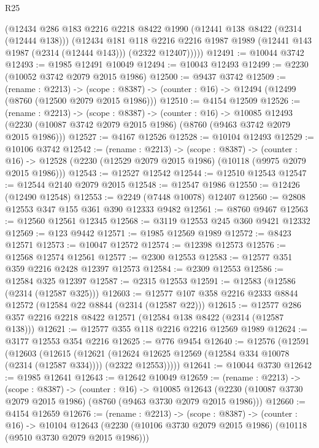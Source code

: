 \begin{lexlean}{R25}
\begin{coremodule}
        (@12434
          @286
          @183
          @2216
          @2218
          @8422
          @1990
          (@12441 @138 @8422 (@2314 (@12444 @138)))
          (@12434
            @181
            @118
            @2216
            @2216
            @1987
            @1989
            (@12441 @143 @1987 (@2314 (@12444 @143)))
            (@2322 @12407)))))
@12491 := @10044 @3742
@12493 := @1985 @12491 @10049
@12494 := @10043 @12493
@12499 := @2230 (@10052 @3742 @2079 @2015 @1986)
@12500 := @9437 @3742
@12509 := (rename : @2213) ->
  (scope : @8387) -> (counter : @16) -> @12494 (@12499 (@8760 (@12500 @2079 @2015 @1986)))
@12510 := @4154 @12509
@12526 := (rename : @2213) ->
  (scope : @8387) ->
  (counter : @16) ->
  @10085 @12493 (@2230 (@10087 @3742 @2079 @2015 @1986) (@8760 (@9463 @3742 @2079 @2015 @1986)))
@12527 := @4167 @12526
@12528 := @10104 @12493
@12529 := @10106 @3742
@12542 := (rename : @2213) ->
  (scope : @8387) ->
  (counter : @16) -> @12528 (@2230 (@12529 @2079 @2015 @1986) (@10118 (@9975 @2079 @2015 @1986)))
@12543 := @12527 @12542
@12544 := @12510 @12543
@12547 := @12544 @2140 @2079 @2015
@12548 := @12547 @1986
@12550 := @12426 (@12490 @12548)
@12553 := @2249 (@7448 @10078) @12407
@12560 := @2808 @12553 @347 @155 @361 @390 @12333 @9482
@12561 := @8760 @9467
@12563 := @12560 @12561 @12345
@12568 := @3119 @12553 @245 @360 @9421 @12332
@12569 := @123 @9442
@12571 := @1985 @12569 @1989
@12572 := @8423 @12571
@12573 := @10047 @12572
@12574 := @12398 @12573
@12576 := @12568 @12574 @12561
@12577 := @2300 @12553
@12583 := @12577 @351 @359 @2216 @2428 @12397 @12573
@12584 := @2309 @12553
@12586 := @12584 @325 @12397
@12587 := @2315 @12553
@12591 := @12583 (@12586 (@2314 (@12587 @325)))
@12603 := @12577 @107 @358 @2216 @2333 @8844 @12572 (@12584 @22 @8844 (@2314 (@12587 @22)))
@12615 := @12577 @286 @357 @2216 @2218 @8422 @12571 (@12584 @138 @8422 (@2314 (@12587 @138)))
@12621 := @12577 @355 @118 @2216 @2216 @12569 @1989
@12624 := @3177 @12553 @354 @2216
@12625 := @776 @9454
@12640 := @12576
    (@12591
      (@12603
        (@12615
          (@12621
            (@12624 @12625 @12569 (@12584 @334 @10078 (@2314 (@12587 @334))))
            (@2322 @12553)))))
@12641 := @10044 @3730
@12642 := @1985 @12641
@12643 := @12642 @10049
@12659 := (rename : @2213) ->
  (scope : @8387) ->
  (counter : @16) ->
  @10085 @12643 (@2230 (@10087 @3730 @2079 @2015 @1986) (@8760 (@9463 @3730 @2079 @2015 @1986)))
@12660 := @4154 @12659
@12676 := (rename : @2213) ->
  (scope : @8387) ->
  (counter : @16) ->
  @10104 @12643 (@2230 (@10106 @3730 @2079 @2015 @1986) (@10118 (@9510 @3730 @2079 @2015 @1986)))

\end{coremodule}
\end{lexlean}
